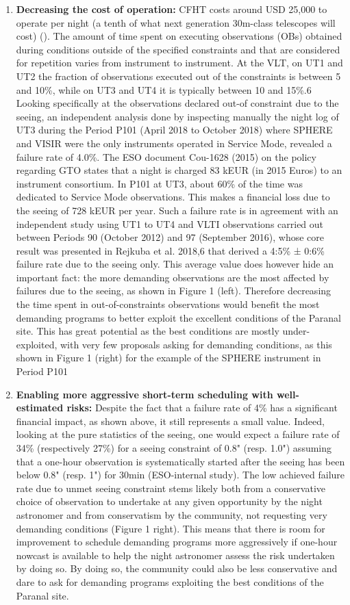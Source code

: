 \begin{enumerate}
    \item \textbf{Decreasing the cost of operation:} CFHT costs around USD 25,000 to operate per night (a tenth of what next generation 30m-class telescopes will cost) (). The amount of time spent on executing observations (OBs) obtained during conditions outside of the specified constraints and that are considered for repetition varies from instrument to instrument. At the VLT, on UT1 and UT2 the fraction of observations executed out of the constraints is between 5 and 10\%, while on UT3 and UT4 it is typically between 10 and 15\%.6 Looking specifically at the observations declared out-of constraint due to the seeing, an independent analysis done by inspecting manually the night log of UT3 during the Period P101 (April 2018 to October 2018) where SPHERE and VISIR were the only instruments operated in Service Mode, revealed a failure rate of 4.0\%. The ESO document Cou-1628 (2015) on the policy regarding GTO states that a night is charged 83 kEUR (in 2015 Euros) to an instrument consortium. In P101 at UT3, about 60\% of the time was dedicated to Service Mode observations. This makes a financial loss due to the seeing of 728 kEUR per year. Such a failure rate is in agreement with an independent study using UT1 to UT4 and VLTI observations carried out between Periods 90 (October 2012) and 97 (September 2016), whose core result was presented in Rejkuba et al. 2018,6 that derived a 4:5\% ± 0:6\% failure rate due to the seeing only. This average value does however hide an important fact: the more demanding observations are the most affected by failures due to the seeing, as shown in Figure 1 (left). Therefore decreasing the time spent in out-of-constraints observations would benefit the most demanding programs to better exploit the excellent conditions of the Paranal site. This has great potential as the best conditions are mostly under-exploited, with very few proposals asking for demanding conditions, as this shown in Figure 1 (right) for the example of the SPHERE instrument in Period P101
    \item \textbf{Enabling more aggressive short-term scheduling with well-estimated risks:} Despite the fact that a failure rate of 4\% has a significant financial impact, as shown above, it still represents a small value. Indeed, looking at the pure statistics of the seeing, one would expect a failure rate of 34\% (respectively 27\%) for a seeing constraint of 0.8" (resp. 1.0") assuming that a one-hour observation is systematically started after the seeing has been below 0.8" (resp. 1") for 30min (ESO-internal study). The low achieved failure rate due to unmet seeing constraint stems likely both from a conservative choice of observation to undertake at any given opportunity by the night astronomer and from conservatism by the community, not requesting very demanding conditions (Figure 1 right). This means that there is room for improvement to schedule demanding programs more aggressively if one-hour nowcast is available to help the night astronomer assess the risk undertaken by doing so. By doing so, the community could also be less conservative and dare to ask for demanding programs exploiting the best conditions of the Paranal site.

\end{enumerate}
